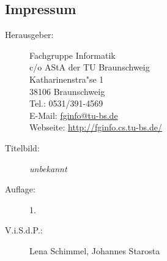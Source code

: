 
\subsection{Impressum} %
\label{sub:impressum}

\begin{description}
\item[Herausgeber:]
	Fachgruppe Informatik\\
	c/o AStA der TU Braunschweig\\
	Katharinenstra"se 1\\
	38106 Braunschweig\\
	Tel.: 0531/391-4569\\
	E-Mail: \url{fginfo@tu-bs.de}\\
	Webseite: \url{http://fginfo.cs.tu-bs.de/}
\item[Titelbild:]
	\textit{unbekannt}

%
\item[Auflage:]
  1.
\item[V.i.S.d.P.:]  %
  Lena Schimmel, Johannes Starosta
\end{description}

